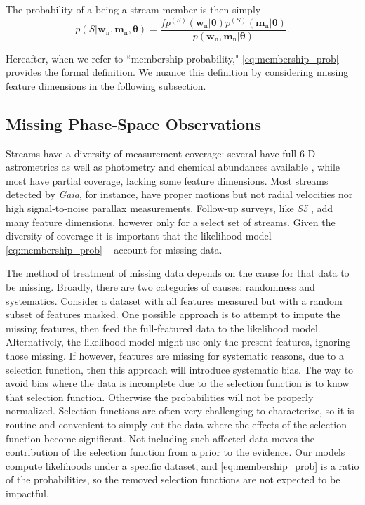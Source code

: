 \documentclass[twocolumn]{aastex631}
\newcommand{\dataarchive}[1]{\textit{#1}}
\newcommand{\Gaia}{\dataarchive{Gaia}}
\newcommand{\mrm}[1]{\mathrm{#1}}
\newcommand{\mbs}[1]{\boldsymbol{#1}}
\newcommand{\pdf}{p}
\newcommand{\nth}[1]{{#1}_{\mrm{n}}}  %
\newcommand{\smallcomponent}[2]{#2^{\scriptscriptstyle (#1)}}
\newcommand{\cmp}[2]{\smallcomponent{#1}{#2}}
\newcommand{\Scmp}[1]{\cmp{S}{#1}}
\newcommand{\Spdf}{\Scmp{\pdf}}
\begin{document}
        The probability of a being a stream member is then simply
        \begin{equation}\label{eq:membership_prob}
            \pdf\!\left(S | \nth{\mbs{w}}, \nth{\mbs{m}}, \mbs{\theta} \right)
            = \frac{f \Spdf(\nth{\mbs{w}}|\mbs{\theta}) \Spdf(\nth{\mbs{m}}|\mbs{\theta}) }{ \pdf(\nth{\mbs{w}}, \nth{\mbs{m}} | \mbs{\theta})}.
        \end{equation}

        Hereafter, when we refer to ``membership probability,"
        \autoref{eq:membership_prob} provides the formal definition. We nuance
        this definition by considering missing feature dimensions in the
        following subsection.

    \subsection{Missing Phase-Space Observations}
    \label{sub:method:missing_data}

        Streams have a diversity of measurement coverage: several have full 6-D
        astrometrics as well as photometry and chemical abundances available
        \citep[e.g.,][]{Koposov+2019, Antoja+2020, Li+2022}, while most have
        partial coverage, lacking some feature dimensions.  Most streams
        detected by \Gaia \citep{Gaia2016, Gaia2023}, for instance, have proper
        motions but not radial velocities nor high signal-to-noise parallax
        measurements.  Follow-up surveys, like \dataarchive{S5} \citep{Li+2019},
        add many feature dimensions, however only for a select set of streams.
        Given the diversity of coverage it is important that the likelihood
        model -- \autoref{eq:membership_prob} -- account for missing data.

        The method of treatment of missing data depends on the cause for that
        data to be missing.  Broadly, there are two categories of causes:
        randomness and systematics.  Consider a dataset with all features
        measured but with a random subset of features masked.  One possible
        approach is to attempt to impute the missing features, then feed the
        full-featured data to the likelihood model. Alternatively, the
        likelihood model might use only the present features, ignoring those
        missing. If however, features are missing for systematic reasons, due to
        a selection function, then this approach will introduce systematic bias.
        The way to avoid bias where the data is incomplete due to the selection
        function is to know that selection function. Otherwise the probabilities
        will not be properly normalized.  Selection functions are often very
        challenging to characterize, so it is routine and convenient to simply
        cut the data where the effects of the selection function become
        significant.  Not including such affected data moves the contribution of
        the selection function from a prior to the evidence.  Our models compute
        likelihoods under a specific dataset, and \autoref{eq:membership_prob}
        is a ratio of the probabilities, so the removed selection functions are
        not expected to be impactful.
\end{document}
